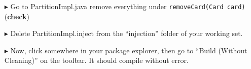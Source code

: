 \begin{itemize}

\item[$\blacktriangleright$] Go to PartitionImpl.java remove everything under \texttt{removeCard(Card card)} ({\bf check})

\item[$\blacktriangleright$] Delete PartitionImpl.inject from the ``injection'' folder of your working set.

\item[$\blacktriangleright$] Now, click somewhere in your package explorer, then go to ``Build (Without Cleaning)'' on the toolbar. It should compile without
error.


\end{itemize}




